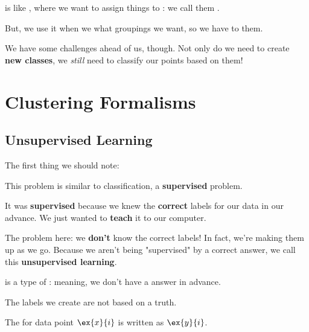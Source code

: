         \begin{concept}
             is like , where we want to assign things to : we call them .
            
            But, we use it when we  what groupings we want, so we have to  them.
        \end{concept}
        
        We have some challenges ahead of us, though. Not only do we need to create \textbf{new classes}, we \textit{still} need to classify our points based on them!

\pagebreak

\section{Clustering Formalisms}

    \subsection{Unsupervised Learning}
        
        The first thing we should note: 
        
        This problem is similar to classification, a \textbf{supervised} problem.
        
        It was \textbf{supervised} because we knew the \textbf{correct} labels for our data in our advance. We just wanted to \textbf{teach} it to our computer.
        
        The problem here: we \textbf{don't} know the correct labels! In fact, we're making them up as we go. Because we aren't being "supervised" by a correct answer, we call this \textbf{unsupervised learning}.\\
        
        \begin{concept}
             is a type of : meaning, we don't have a  answer in advance.
            
            The labels we create are not based on a  truth.
            
            The  for data point $\ex{x}{i}$ is written as $\ex{y}{i}$.
        \end{concept}
        
